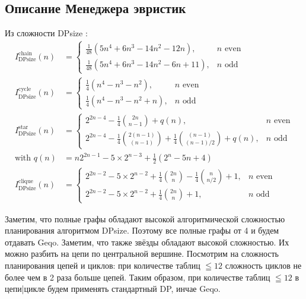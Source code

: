 \documentclass[12pt]{article}
\begin{document}
\begin{flushleft}
\section*{Описание Менеджера эвристик}
Из сложности DPsize \cite{Moerkotte}:
\begin{align*}
    I^{\text{chain}}_{\text{DPsize}}(n) &=
    \begin{cases}
        \frac{1}{48} (5n^4 + 6n^3 - 14n^2 - 12n), & n \text{ even} \\
        \frac{1}{48} (5n^4 + 6n^3 - 14n^2 - 6n + 11), & n \text{ odd}
    \end{cases}
    \\
    I^{\text{cycle}}_{\text{DPsize}}(n) &=
    \begin{cases}
        \frac{1}{4} (n^4 - n^3 - n^2), & n \text{ even} \\
        \frac{1}{4} (n^4 - n^3 - n^2 + n), & n \text{ odd}
    \end{cases}
    \\
    I^{\text{star}}_{\text{DPsize}}(n) &=
    \begin{cases}
        2^{2n-4} - \frac{1}{4} \binom{2n}{n-1} + q(n), & n \text{ even} \\
        2^{2n-4} - \frac{1}{4} \binom{2(n-1)}{(n-1)} + \frac{1}{4} \binom{(n-1)}{(n-1)/2} + q(n), & n \text{ odd}
    \end{cases}
    \\
    \text{with } q(n) &= n 2^{2n-1} - 5 \times 2^{n-3} + \frac{1}{2} (2^n - 5n + 4)
    \\
    I^{\text{clique}}_{\text{DPsize}}(n) &=
    \begin{cases}
        2^{2n-2} - 5 \times 2^{n-2} + \frac{1}{4} \binom{2n}{n} - \frac{1}{4} \binom{n}{n/2} + 1, & n \text{ even} \\
        2^{2n-2} - 5 \times 2^{n-2} + \frac{1}{4} \binom{2n}{n} + 1, & n \text{ odd}
    \end{cases}
\end{align*}

Заметим, что полные графы  обладают высокой алгоритмической сложностью планирования
алгоритмом DPsize. Поэтому все полные графы от 4 и будем отдавать Geqo. Заметим, что также 
звёзды обладают высокой сложностью. Их можно разбить на цепи по центральной вершине.
Посмотрим на сложность планирования цепей и циклов: при количестве таблиц $\leqq 12$ сложность циклов не более чем в 2 раза 
больше цепей. Таким образом, при количестве таблиц $\leqq 12$ в цепи|цикле будем применять стандартный DP, инчае Geqo.


\end{flushleft}
\end{document}
